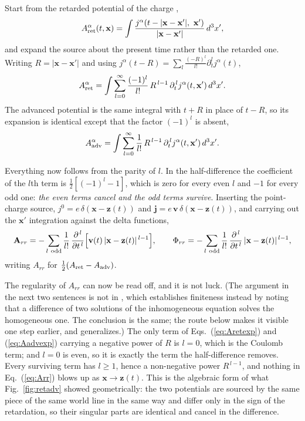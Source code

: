 \documentclass[preprint]{aastex701}
\begin{document}
Start from the retarded potential of the charge \citep[see, e.g.,][ch.~14]
{jackson1999},
\begin{equation}
A^\alpha_{\rm ret}(t,\mathbf x)
= \int \frac{j^\alpha\!\left(t - |\mathbf x - \mathbf x'|,\ \mathbf x'\right)}
             {|\mathbf x - \mathbf x'|}\,d^3x' ,
\label{eq:Aret}
\end{equation}
and expand the source about the present time rather than the retarded one.
Writing $R = |\mathbf x - \mathbf x'|$ and using
$j^\alpha(t-R) = \sum_l \frac{(-R)^l}{l!}\partial_t^l j^\alpha(t)$,
\begin{equation}
A^\alpha_{\rm ret}
= \int \sum_{l=0}^{\infty}\frac{(-1)^l}{l!}\,R^{\,l-1}\,
  \partial_t^{\,l} j^\alpha(t,\mathbf x')\,d^3x' .
\label{eq:Aretexp}
\end{equation}
The advanced potential is the same integral with $t+R$ in place of $t-R$, so
its expansion is identical except that the factor $(-1)^l$ is absent,
\begin{equation}
A^\alpha_{\rm adv}
= \int \sum_{l=0}^{\infty}\frac{1}{l!}\,R^{\,l-1}\,
  \partial_t^{\,l} j^\alpha(t,\mathbf x')\,d^3x' .
\label{eq:Aadvexp}
\end{equation}

Everything now follows from the parity of $l$. In the half-difference the
coefficient of the $l$th term is $\tfrac12[(-1)^l - 1]$, which is zero for
every even $l$ and $-1$ for every odd one: \emph{the even terms cancel and the
odd terms survive}. Inserting the point-charge source,
$j^0 = e\,\delta(\mathbf x - \mathbf z(t))$ and
$\mathbf j = e\,\mathbf v\,\delta(\mathbf x - \mathbf z(t))$, and carrying out
the $\mathbf x'$ integration against the delta functions,
\begin{equation}
\mathbf A_{rr}
= -\sum_{l\ \rm odd}\frac{1}{l!}\,
  \frac{\partial^{\,l}}{\partial t^{\,l}}
  \Big[\mathbf v(t)\,|\mathbf x - \mathbf z(t)|^{\,l-1}\Big],
\qquad
\Phi_{rr}
= -\sum_{l\ \rm odd}\frac{1}{l!}\,
  \frac{\partial^{\,l}}{\partial t^{\,l}}
  \,|\mathbf x - \mathbf z(t)|^{\,l-1},
\label{eq:Arr}
\end{equation}
writing $A_{rr}$ for $\tfrac12(A_{\rm ret}-A_{\rm adv})$.

The regularity of $A_{rr}$ can now be read off, and it is not luck. (The
argument in the next two sentences is not in \citealt{zhang2006}, which
establishes finiteness instead by noting that a difference of two solutions of
the inhomogeneous equation solves the homogeneous one. The conclusion is the
same; the route below makes it visible one step earlier, and generalizes.) The only
term of Eqs.~(\ref{eq:Aretexp}) and (\ref{eq:Aadvexp}) carrying a negative
power of $R$ is $l=0$, which is the Coulomb term; and $l=0$ is even, so it is
exactly the term the half-difference removes. Every surviving term has
$l\ge1$, hence a non-negative power $R^{\,l-1}$, and nothing in
Eq.~(\ref{eq:Arr}) blows up as $\mathbf x \to \mathbf z(t)$. This is the
algebraic form of what Fig.~\ref{fig:retadv} showed geometrically: the two
potentials are sourced by the same piece of the same world line in the same way
and differ only in the sign of the retardation, so their singular parts are
identical and cancel in the difference.
\end{document}
